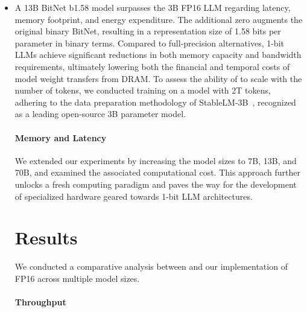 \begin{itemize}
    \item A 13B BitNet b1.58 model surpasses the 3B FP16 LLM regarding latency, memory footprint, and energy expenditure. The additional zero augments the original binary BitNet, resulting in a representation size of 1.58 bits per parameter in binary terms. Compared to full-precision alternatives, 1-bit LLMs achieve significant reductions in both memory capacity and bandwidth requirements, ultimately lowering both the financial and temporal costs of model weight transfers from DRAM. To assess the ability of  to scale with the number of tokens, we conducted training on a  model with 2T tokens, adhering to the data preparation methodology of StableLM-3B~\cite{StableLM-3B-4E1T}, recognized as a leading open-source 3B parameter model. \paragraph{Memory and Latency}

We extended our experiments by increasing the model sizes to 7B, 13B, and 70B, and examined the associated computational cost. This approach further unlocks a fresh computing paradigm and paves the way for the development of specialized hardware geared towards 1-bit LLM architectures. \section{Results}

We conducted a comparative analysis between  and our implementation of FP16  across multiple model sizes. \paragraph{Throughput}


\end{itemize}
